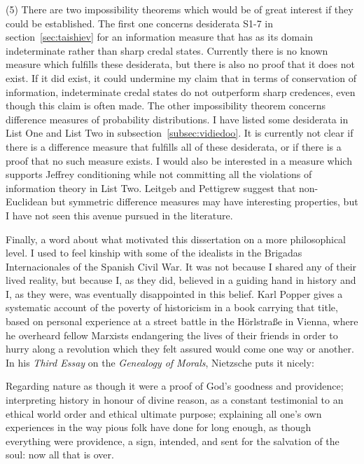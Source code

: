 \documentclass[phd,12pt,oneside]{ubcthesis}
\begin{document}
(5) There are two impossibility theorems which would be of great
interest if they could be established. The first one concerns
desiderata S1-7 in section~\ref{sec:taishiev} for an information
measure that has as its domain indeterminate rather than sharp credal
states. Currently there is no known measure which fulfills these
desiderata, but there is also no proof that it does not exist. If it
did exist, it could undermine my claim that in terms of conservation
of information, indeterminate credal states do not outperform sharp
credences, even though this claim is often made. The other
impossibility theorem concerns difference measures of probability
distributions. I have listed some desiderata in List One and List Two
in subsection~\ref{subsec:vidiedoo}. It is currently not clear if
there is a difference measure that fulfills all of these desiderata,
or if there is a proof that no such measure exists. I would also be
interested in a measure which supports Jeffrey conditioning while not
committing all the violations of information theory in List Two.
Leitgeb and Pettigrew suggest that non-Euclidean but symmetric
difference measures may have interesting properties, but I have not
seen this avenue pursued in the literature.

Finally, a word about what motivated this dissertation on a more
philosophical level. I used to feel kinship with some of the idealists
in the Brigadas Internacionales of the Spanish Civil War. It was not
because I shared any of their lived reality, but because I, as they
did, believed in a guiding hand in history and I, as they were, was
eventually disappointed in this belief. Karl Popper gives a systematic
account of the poverty of historicism in a book carrying that title,
based on personal experience at a street battle in the
H{\"o}rlstra{\ss}e in Vienna, where he overheard fellow Marxists
endangering the lives of their friends in order to hurry along a
revolution which they felt assured would come one way or another. In
his \emph{Third Essay} on the \emph{Genealogy of Morals}, Nietzsche
puts it nicely:

\begin{quotex}
  Regarding nature as though it were a proof of God's goodness and
  providence; interpreting history in honour of divine reason, as a
  constant testimonial to an ethical world order and ethical
  ultimate purpose; explaining all one's own experiences in the way
  pious folk have done for long enough, as though everything were
  providence, a sign, intended, and sent for the salvation of the
  soul: now all that is over.
\end{quotex}
\end{document}
